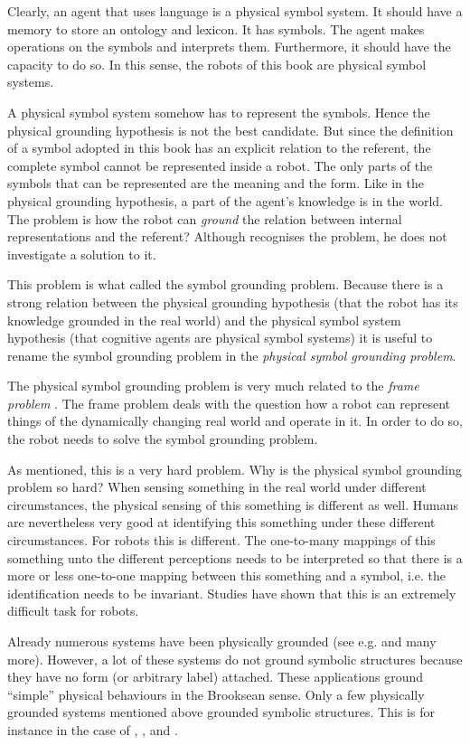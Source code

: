 Clearly, an agent that uses language is a physical symbol system. It should have a memory to store an ontology and lexicon. It has symbols. The agent makes operations on the symbols and interprets them. Furthermore, it should have the capacity to do so. In this sense, the robots of this book are physical symbol systems.

A physical symbol system somehow has to represent the symbols. Hence the physical grounding hypothesis is not the best candidate. But since the definition of a symbol adopted in this book has an explicit relation to the referent, the complete symbol cannot be represented inside a robot. The only parts of the symbols that can be represented are the meaning and the form. Like in the physical grounding hypothesis, a part of the agent's knowledge is in the world. The problem is how the robot can {\em ground} the relation between internal representations and the referent? Although \citet{newell:1990} recognises the problem, he does not investigate a solution to it.

This problem is what \citet{harnad:1990} called the symbol grounding problem. Because there is a strong relation between the physical grounding hypothesis (that the robot has its knowledge grounded in the real world) and the physical symbol system hypothesis (that cognitive agents are physical symbol systems) it is useful to rename the symbol grounding problem in the {\em physical symbol grounding problem}.

The physical symbol grounding problem is very much related to the {\em frame problem} \citep{pylyshyn:1987}. The frame problem deals with the question how a robot can represent things of the dynamically changing real world and operate in it. In order to do so, the robot needs to solve the symbol grounding problem. 


As mentioned, this is a very hard problem. Why is the physical symbol grounding problem so hard? When sensing something in the real world under different circumstances, the physical sensing of this something is different as well. Humans are nevertheless very good at identifying this something under these different circumstances. For robots this is different. The one-to-many mappings of this something unto the different perceptions needs to be interpreted so that there is a more or less one-to-one mapping between this something and a symbol, i.e. the identification needs to be invariant. Studies have shown that this is an extremely difficult task for robots.

Already numerous systems have been physically grounded (see e.g. \citealt{brooks:1990,steels:1994,barnesetal:1997,KroBunVlaMot99,taninolfi:1998,berthouzekuniyoshi:1998,pfeiferscheier:1999,billard:1997a,rosenstein:1998a,yancostein} and many more). However, a lot of these systems do not ground symbolic structures because they have no form (or arbitrary label) attached. These applications ground ``simple'' physical behaviours in the Brooksean sense. Only a few physically grounded systems mentioned above grounded symbolic structures. This is for instance in the case of \citet{yancostein}, \citet{billard:1997a}, and \citet{rosenstein:1998a}. 


